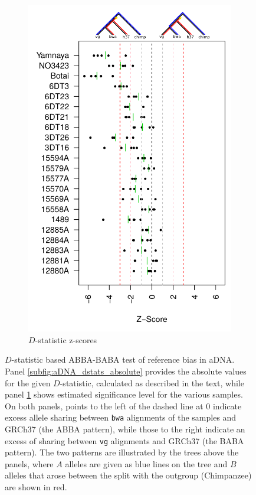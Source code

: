 \begin{figure}[htbp!]
\begin{subfigure}[t]{0.49\textwidth}
    \includegraphics[width=1.0\textwidth]{Chapter3/Figs/aDNA_d_stats_z_score.pdf}
    \caption{$D$-statistic z-scores}
    \label{subfig:aDNA_dstats_zscore}
  \end{subfigure}
  \caption[$D$-statistic based ABBA-BABA test of reference bias in aDNA]{
    $D$-statistic based ABBA-BABA test of reference bias in aDNA.
    Panel \ref{subfig:aDNA_dstats_absolute} provides the absolute values for the given $D$-statistic, calculated as described in the text, while panel \ref{subfig:aDNA_dstats_zscore} shows estimated significance level for the various samples.
    On both panels, points to the left of the dashed line at 0 indicate excess allele sharing between {\tt bwa} alignments of the samples and GRCh37 (the ABBA pattern), while those to the right indicate an excess of sharing between {\tt vg} alignments and GRCh37 (the BABA pattern).
    The two patterns are illustrated by the trees above the panels, where $A$ alleles are given as blue lines on the tree and $B$ alleles that arose between the split with the outgroup (Chimpanzee) are shown in red.
  }
\label{fig:aDNA_dstats}
\end{figure}


